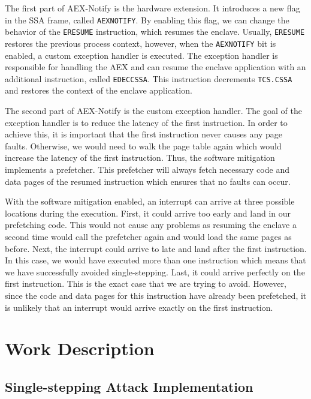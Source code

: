 \documentclass{llncs}
\begin{document}
The first part of AEX-Notify is the hardware extension.
It introduces a new flag in the SSA frame, called \texttt{AEXNOTIFY}.
By enabling this flag, we can change the behavior of the \texttt{ERESUME} instruction,
which resumes the enclave.
Usually, \texttt{ERESUME} restores the previous process context,
however, when the \texttt{AEXNOTIFY} bit is enabled,
a custom exception handler is executed.
The exception handler is responsible for handling the AEX and
can resume the enclave application with an additional instruction, called \texttt{EDECCSSA}.
This instruction decrements \texttt{TCS.CSSA} and restores the context of the enclave application.

The second part of AEX-Notify is the custom exception handler.
The goal of the exception handler is to reduce the latency of the first instruction.
In order to achieve this, it is important that the first instruction never causes any page faults.
Otherwise, we would need to walk the page table again which would increase the latency of the first instruction.
Thus, the software mitigation implements a prefetcher.
This prefetcher will always fetch necessary code and data pages of the resumed
instruction which ensures that no faults can occur.

With the software mitigation enabled, an interrupt can arrive at three possible
locations during the execution.
First, it could arrive too early and land in our prefetching code.
This would not cause any problems as resuming the enclave a second time would
call the prefetcher again and would load the same pages as before.
Next, the interrupt could arrive to late and land after the first instruction.
In this case, we would have executed more than one instruction which means
that we have successfully avoided single-stepping.
Last, it could arrive perfectly on the first instruction.
This is the exact case that we are trying to avoid.
However, since the code and data pages for this instruction have already been prefetched,
it is unlikely that an interrupt would arrive exactly on the first instruction.


\section{Work Description}

\subsection{Single-stepping Attack Implementation}
\end{document}
